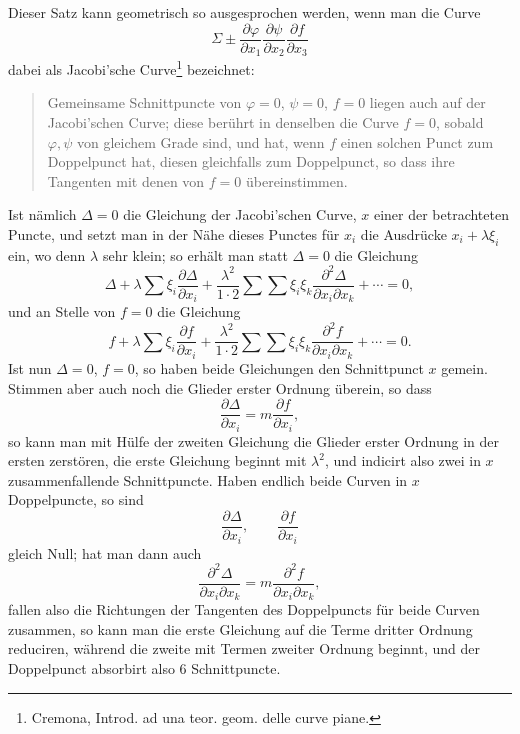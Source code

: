 \documentclass[10pt]{article}
\begin{document}
Dieser Satz kann geometrisch so ausgesprochen werden, wenn man die Curve
\[
\Sigma\pm
\frac{\partial\varphi}{\partial x_1}
\frac{\partial\psi}{\partial x_2}
\frac{\partial f}{\partial x_3}
\]
dabei als Jacobi'sche Curve\footnote{Cremona, Introd. ad una teor. geom. delle curve piane.} bezeichnet:

\begin{quote}
Gemeinsame Schnittpuncte von \(\varphi=0\), \(\psi=0\), \(f=0\) liegen auch auf der Jacobi'schen Curve; diese berührt in denselben die Curve \(f=0\), sobald \(\varphi,\psi\) von gleichem Grade sind, und hat, wenn \(f\) einen solchen Punct zum Doppelpunct hat, diesen gleichfalls zum Doppelpunct, so dass ihre Tangenten mit denen von \(f=0\) übereinstimmen.
\end{quote}

Ist nämlich \(\Delta=0\) die Gleichung der Jacobi'schen Curve, \(x\) einer der betrachteten Puncte, und setzt man in der Nähe dieses Punctes für \(x_i\) die Ausdrücke \(x_i+\lambda\xi_i\) ein, wo denn \(\lambda\) sehr klein; so erhält man statt \(\Delta=0\) die Gleichung
\[
\Delta+\lambda\sum \xi_i\frac{\partial\Delta}{\partial x_i}
+\frac{\lambda^2}{1\cdot2}\sum\sum \xi_i\xi_k
\frac{\partial^2\Delta}{\partial x_i\partial x_k}
+\cdots=0,
\]
und an Stelle von \(f=0\) die Gleichung
\[
f+\lambda\sum \xi_i\frac{\partial f}{\partial x_i}
+\frac{\lambda^2}{1\cdot2}\sum\sum \xi_i\xi_k
\frac{\partial^2f}{\partial x_i\partial x_k}
+\cdots=0.
\]
Ist nun \(\Delta=0\), \(f=0\), so haben beide Gleichungen den Schnittpunct \(x\) gemein. Stimmen aber auch noch die Glieder erster Ordnung überein, so dass
\[
\frac{\partial\Delta}{\partial x_i}
=m\frac{\partial f}{\partial x_i},
\]
so kann man mit Hülfe der zweiten Gleichung die Glieder erster Ordnung in der ersten zerstören, die erste Gleichung beginnt mit \(\lambda^2\), und indicirt also zwei in \(x\) zusammenfallende Schnittpuncte. Haben endlich beide Curven in \(x\) Doppelpuncte, so sind
\[
\frac{\partial\Delta}{\partial x_i},\qquad
\frac{\partial f}{\partial x_i}
\]
gleich Null; hat man dann auch
\[
\frac{\partial^2\Delta}{\partial x_i\partial x_k}
=m\frac{\partial^2f}{\partial x_i\partial x_k},
\]
fallen also die Richtungen der Tangenten des Doppelpuncts für beide Curven zusammen, so kann man die erste Gleichung auf die Terme dritter Ordnung reduciren, während die zweite mit Termen zweiter Ordnung beginnt, und der Doppelpunct absorbirt also 6 Schnittpuncte.
\end{document}
